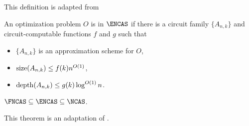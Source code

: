This definition is adapted from \autocite[Definition~1.31]{fg06}

\begin{definition}
  An optimization problem $O$ is in $\ENCAS$ if there is a circuit family $\{A_{n, k}\}$ and circuit-computable functions $f$ and $g$ such that
  \begin{itemize}
  \item $\{A_{n, k}\}$ is an approximation scheme for $O$,
  \item $\operatorname{size}(A_{n, k}) \leq f(k) n^{O(1)}$,
  \item $\operatorname{depth}(A_{n, k}) \leq g(k) \log^{O(1)} n$.
  \end{itemize}
\end{definition}

\begin{proposition}\label{prop:encas}
  $\FNCAS \subseteq \ENCAS \subseteq \NCAS$.
\end{proposition}

This theorem is an adaptation of \autocite[Theorem~1.32]{fg06}.

